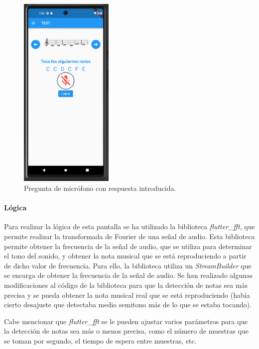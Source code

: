 \begin{figure}[H]
  \centering
  \includegraphics[width=0.4\textwidth]{imagenes/c7/entradamicrofono3.png}
  \caption{Pregunta de micrófono con respuesta introducida.}
  \label{fig:login}
\end{figure}

\paragraph*{Lógica}
Para realizar la lógica de esta pantalla se ha utilizado la biblioteca \textit{flutter\_fft}, que permite realizar la transformada de Fourier de una señal de audio.
Esta biblioteca permite obtener la frecuencia de la señal de audio, que se utiliza para determinar el tono del sonido, y obtener la nota musical que se está reproduciendo a partir de dicho valor de frecuencia.
Para ello, la biblioteca utiliza un \textit{StreamBuilder} que se encarga de obtener la frecuencia de la señal de audio. 
Se han realizado algunas modificaciones al código de la biblioteca para que la detección de notas sea más precisa y se pueda obtener la nota musical real que se está reproduciendo (había cierto desajuste que detectaba medio semitono más de lo que se estaba tocando).

Cabe mencionar que \textit{flutter\_fft} se le pueden ajustar varios parámetros para que la detección de notas sea más o menos precisa, como el número de muestras que se toman por segundo, el tiempo de espera entre muestras, etc.

